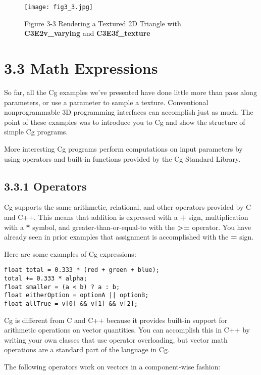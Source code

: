 \documentclass[../main.tex]{subfiles}
\begin{document}
\begin{figure}
    \centering
    \texttt{[image: fig3\_3.jpg]}
    \caption{Figure 3-3 Rendering a Textured 2D Triangle with \textbf{C3E2v_varying} and \textbf{C3E3f_texture}}
    \label{fig:3-3}
\end{figure}

\section{3.3 Math Expressions}

So far, all the Cg examples we've presented have done little more than pass along parameters, or use a parameter to sample a texture. Conventional nonprogrammable 3D programming interfaces can accomplish just as much. The point of these examples was to introduce you to Cg and show the structure of simple Cg programs.

More interesting Cg programs perform computations on input parameters by using operators and built-in functions provided by the Cg Standard Library.

\subsection{3.3.1 Operators}

Cg supports the same arithmetic, relational, and other operators provided by C and C++. This means that addition is expressed with a \textbf{+} sign, multiplication with a \textbf{*} symbol, and greater-than-or-equal-to with the \textbf{>=} operator. You have already seen in prior examples that assignment is accomplished with the \textbf{=} sign.

Here are some examples of Cg expressions:

\FloatBarrier
\begin{lstlisting}
float total = 0.333 * (red + green + blue);
total += 0.333 * alpha;
float smaller = (a < b) ? a : b;
float eitherOption = optionA || optionB;
float allTrue = v[0] && v[1] && v[2];
\end{lstlisting}
\FloatBarrier

Cg is different from C and C++ because it provides built-in support for arithmetic operations on vector quantities. You can accomplish this in C++ by writing your own classes that use operator overloading, but vector math operations are a standard part of the language in Cg.

The following operators work on vectors in a component-wise fashion:
\end{document}
